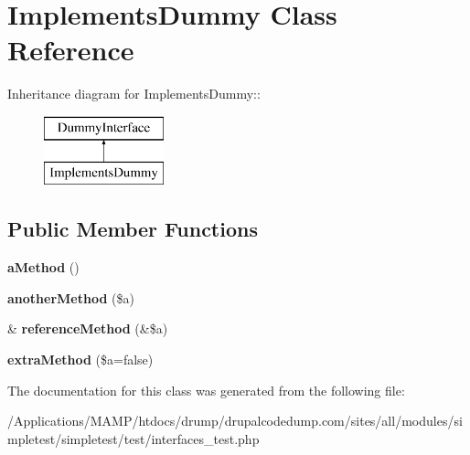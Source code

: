 \hypertarget{class_implements_dummy}{
\section{ImplementsDummy Class Reference}
\label{class_implements_dummy}
}
Inheritance diagram for ImplementsDummy::\begin{figure}[H]
\begin{center}
\leavevmode
\includegraphics[height=2cm]{class_implements_dummy}
\end{center}
\end{figure}
\subsection*{Public Member Functions}
\begin{DoxyCompactItemize}
\item 
\hypertarget{class_implements_dummy_a3d034c99aa3f67299c5bc984dcf3a8b5}{
{\bfseries aMethod} ()}
\label{class_implements_dummy_a3d034c99aa3f67299c5bc984dcf3a8b5}

\item 
\hypertarget{class_implements_dummy_a9953b03977278aef579a2f7cb704ef8c}{
{\bfseries anotherMethod} (\$a)}
\label{class_implements_dummy_a9953b03977278aef579a2f7cb704ef8c}

\item 
\hypertarget{class_implements_dummy_a0920565a793cefd6f8b825a2b4be87c4}{
\& {\bfseries referenceMethod} (\&\$a)}
\label{class_implements_dummy_a0920565a793cefd6f8b825a2b4be87c4}

\item 
\hypertarget{class_implements_dummy_a91bcd43045d6b6fb8db6f7373ba28aab}{
{\bfseries extraMethod} (\$a=false)}
\label{class_implements_dummy_a91bcd43045d6b6fb8db6f7373ba28aab}

\end{DoxyCompactItemize}


The documentation for this class was generated from the following file:\begin{DoxyCompactItemize}
\item 
/Applications/MAMP/htdocs/drump/drupalcodedump.com/sites/all/modules/simpletest/simpletest/test/interfaces\_\-test.php\end{DoxyCompactItemize}
